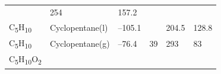 \documentclass[
  9pt,
]{extbook}
\theoremstyle{definition}
\theoremstyle{definition}
\theoremstyle{definition}
\theoremstyle{remark}
\begin{document}
\begin{longtable}[]{@{}llllll@{}}
\begin{minipage}[t]{0.15\columnwidth}
\strut
\end{minipage} & \begin{minipage}[t]{0.14\columnwidth}\raggedright
254\strut
\end{minipage} & \begin{minipage}[t]{0.14\columnwidth}\raggedright
157.2\strut
\end{minipage}\tabularnewline
\begin{minipage}[t]{0.07\columnwidth}\raggedright
C\textsubscript{5}H\textsubscript{10}\strut
\end{minipage} & \begin{minipage}[t]{0.17\columnwidth}\raggedright
Cyclopentane(l)\strut
\end{minipage} & \begin{minipage}[t]{0.15\columnwidth}\raggedright
--105.1\strut
\end{minipage} & \begin{minipage}[t]{0.15\columnwidth}\raggedright
\strut
\end{minipage} & \begin{minipage}[t]{0.14\columnwidth}\raggedright
204.5\strut
\end{minipage} & \begin{minipage}[t]{0.14\columnwidth}\raggedright
128.8\strut
\end{minipage}\tabularnewline
\begin{minipage}[t]{0.07\columnwidth}\raggedright
C\textsubscript{5}H\textsubscript{10}\strut
\end{minipage} & \begin{minipage}[t]{0.17\columnwidth}\raggedright
Cyclopentane(g)\strut
\end{minipage} & \begin{minipage}[t]{0.15\columnwidth}\raggedright
--76.4\strut
\end{minipage} & \begin{minipage}[t]{0.15\columnwidth}\raggedright
39\strut
\end{minipage} & \begin{minipage}[t]{0.14\columnwidth}\raggedright
293\strut
\end{minipage} & \begin{minipage}[t]{0.14\columnwidth}\raggedright
83\strut
\end{minipage}\tabularnewline
\begin{minipage}[t]{0.07\columnwidth}\raggedright
C\textsubscript{5}H\textsubscript{10}O\textsubscript{2}\strut
\end{minipage} & \begin{minipage}[t]{0.17\columnwidth}\raggedright

\end{minipage}
\end{longtable}
\end{document}
